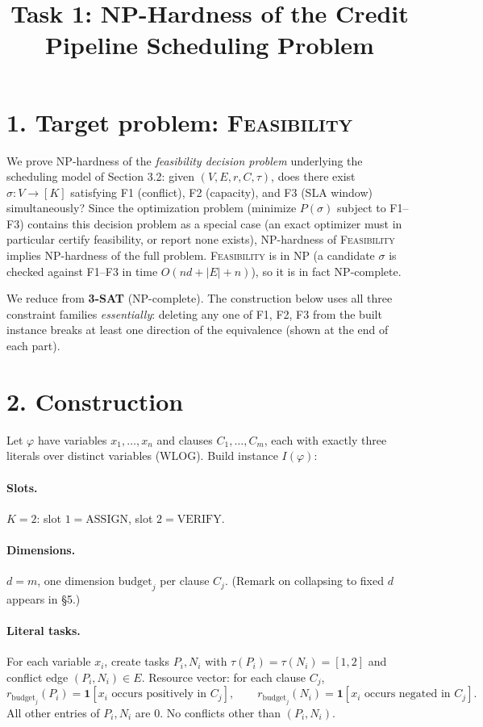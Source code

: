 \documentclass[11pt]{article}
\title{Task 1: NP-Hardness of the Credit Pipeline Scheduling Problem}
\author{}
\date{}
\begin{document}
\maketitle
\vspace{-2em}

\section*{1. Target problem: \textsc{Feasibility}}
We prove NP-hardness of the \emph{feasibility decision problem} underlying the scheduling
model of Section 3.2: given $(V, E, r, C, \tau)$, does there exist $\sigma: V \to [K]$
satisfying F1 (conflict), F2 (capacity), and F3 (SLA window) simultaneously? Since
the optimization problem (minimize $P(\sigma)$ subject to F1--F3) contains this decision
problem as a special case (an exact optimizer must in particular certify feasibility, or
report none exists), NP-hardness of \textsc{Feasibility} implies NP-hardness of the full
problem. \textsc{Feasibility} is in NP (a candidate $\sigma$ is checked against F1--F3 in
time $O(nd + |E| + n)$), so it is in fact NP-complete.

We reduce from \textbf{3-SAT} (NP-complete). The construction below uses all three
constraint families \emph{essentially}: deleting any one of F1, F2, F3 from the built
instance breaks at least one direction of the equivalence (shown at the end of each part).

\section*{2. Construction}
Let $\varphi$ have variables $x_1,\dots,x_n$ and clauses $C_1,\dots,C_m$, each with exactly
three literals over distinct variables (WLOG). Build instance $I(\varphi)$:

\paragraph{Slots.} $K = 2$: slot $1 = \mathrm{ASSIGN}$, slot $2 = \mathrm{VERIFY}$.

\paragraph{Dimensions.} $d = m$, one dimension $\mathrm{budget}_j$ per clause $C_j$.
(Remark on collapsing to fixed $d$ appears in \S5.)

\paragraph{Literal tasks.} For each variable $x_i$, create tasks $P_i, N_i$ with
$\tau(P_i)=\tau(N_i)=[1,2]$ and conflict edge $(P_i,N_i)\in E$. Resource vector:
for each clause $C_j$,
$$ r_{\mathrm{budget}_j}(P_i) = \mathbf{1}[x_i \text{ occurs positively in } C_j], \qquad
   r_{\mathrm{budget}_j}(N_i) = \mathbf{1}[x_i \text{ occurs negated in } C_j]. $$
All other entries of $P_i, N_i$ are $0$. No conflicts other than $(P_i,N_i)$.
\end{document}
